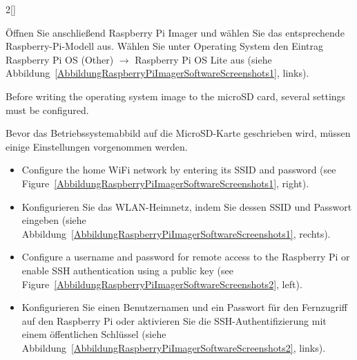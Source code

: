 \begin{paracol}{2}[]
\colger

Öffnen Sie anschließend Raspberry Pi Imager und wählen Sie das entsprechende Raspberry-Pi-Modell aus. Wählen Sie unter Operating System den Eintrag Raspberry Pi OS (Other) \(\rightarrow\) Raspberry Pi OS Lite aus (siehe Abbildung~\ref{AbbildungRaspberryPiImagerSoftwareScreenshots1}, links).

\coleng

Before writing the operating system image to the microSD card, several settings must be configured.

\colger

Bevor das Betriebssystemabbild auf die MicroSD-Karte geschrieben wird, müssen einige Einstellungen vorgenommen werden.

\coleng

\begin{itemize}
	\item Configure the home WiFi network by entering its SSID and password (see Figure~\ref{AbbildungRaspberryPiImagerSoftwareScreenshots1}, right).
\end{itemize}

\colger

\begin{itemize}
	\item Konfigurieren Sie das WLAN-Heimnetz, indem Sie dessen SSID und Passwort eingeben (siehe Abbildung~\ref{AbbildungRaspberryPiImagerSoftwareScreenshots1}, rechts).
\end{itemize}

\coleng

\begin{itemize}
	\item Configure a username and password for remote access to the Raspberry Pi or enable SSH authentication using a public key (see Figure~\ref{AbbildungRaspberryPiImagerSoftwareScreenshots2}, left).
\end{itemize}

\colger

\begin{itemize}
	\item Konfigurieren Sie einen Benutzernamen und ein Passwort für den Fernzugriff auf den Raspberry Pi oder aktivieren Sie die SSH-Authentifizierung mit einem öffentlichen Schlüssel (siehe Abbildung~\ref{AbbildungRaspberryPiImagerSoftwareScreenshots2}, links).
\end{itemize}

\colende


\end{paracol}
